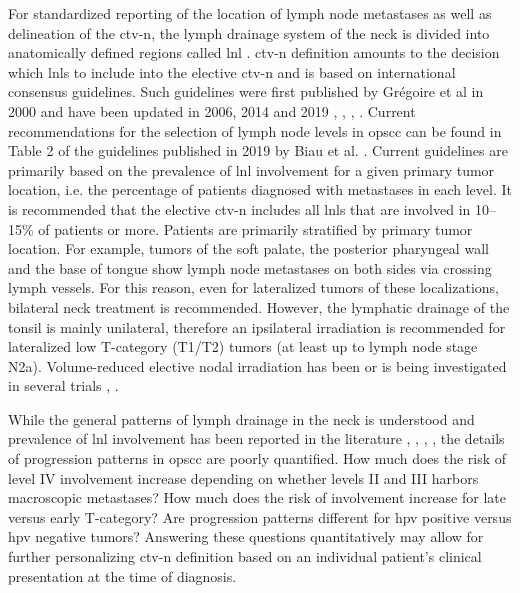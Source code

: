\documentclass[\relativeRoot/main.tex]{subfiles}
\begin{document}
For standardized reporting of the location of lymph node metastases as well as delineation of the \gls{ctv-n}, the lymph drainage system of the neck is divided into anatomically defined regions called \gls{lnl} \cite{gregoire_delineation_2014}. \gls{ctv-n} definition amounts to the decision which \glspl{lnl} to include into the elective \gls{ctv-n} and is based on international consensus guidelines. Such guidelines were first published by Grégoire et al in 2000 and have been updated in 2006, 2014 and 2019 \cite{biau_selection_2019}, \cite{gregoire_delineation_2014}, \cite{gregoire_selection_2000}, \cite{gregoire_proposal_2006}. Current recommendations for the selection of lymph node levels in \gls{opscc} can be found in Table 2 of the guidelines published in 2019 by Biau et al. \cite{biau_selection_2019}. Current guidelines are primarily based on the prevalence of \gls{lnl} involvement for a given primary tumor location, i.e. the percentage of patients diagnosed with metastases in each level. It is recommended that the elective \gls{ctv-n} includes all \glspl{lnl} that are involved in 10–15\% of patients or more. Patients are primarily stratified by primary tumor location. For example, tumors of the soft palate, the posterior pharyngeal wall and the base of tongue show lymph node metastases on both sides via crossing lymph vessels. For this reason, even for lateralized tumors of these localizations, bilateral neck treatment is recommended. However, the lymphatic drainage of the tonsil is mainly unilateral, therefore an ipsilateral irradiation is recommended for lateralized low T-category (T1/T2) tumors (at least up to lymph node stage N2a). Volume-reduced elective nodal irradiation has been or is being investigated in several trials \cite{bratman_cctg_2020}, \cite{al-mamgani_contralateral_2017}.

While the general patterns of lymph drainage in the neck is understood and prevalence of \gls{lnl} involvement has been reported in the literature \cite{gregoire_selection_2000}, \cite{candela_patterns_1990}, \cite{iyizoba-ebozue_retropharyngeal_2020}, \cite{bauwens_prevalence_2021}, the details of progression patterns in \gls{opscc} are poorly quantified. How much does the risk of level IV involvement increase depending on whether levels II and III harbors macroscopic metastases? How much does the risk of involvement increase for late versus early T-category? Are progression patterns different for \gls{hpv} positive versus \gls{hpv} negative tumors? Answering these questions quantitatively may allow for further personalizing \gls{ctv-n} definition based on an individual patient's clinical presentation at the time of diagnosis.
\end{document}
